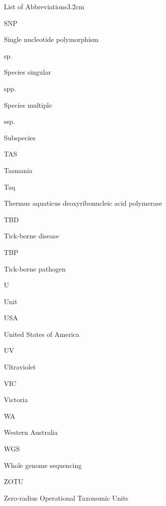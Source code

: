 \documentclass[a4paper, nobind]{templates/ociamthesis}
\begin{document}
\begin{romanpages}
\begin{mclistof}{List of Abbreviations}{3.2cm}
\item[SNP]

Single nucleotide polymorphism

\item[sp.]

Species singular

\item[spp.]

Species multiple

\item[ssp.]

Subspecies

\item[TAS]

Tasmania

\item[Taq]

Thermus aquaticus deoxyribonucleic acid polymerase

\item[TBD]

Tick-borne disease

\item[TBP]

Tick-borne pathogen

\item[U]

Unit

\item[USA]

United States of America

\item[UV]

Ultraviolet

\item[VIC]

Victoria

\item[WA]

Western Australia

\item[WGS]

Whole genome sequencing

\item[ZOTU]

Zero-radius Operational Taxonomic Units

\end{mclistof} 


\end{romanpages}

\flushbottom
\end{document}
